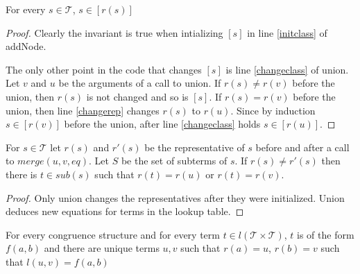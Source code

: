 











\begin{invariant}

For every $s \in \mathcal{T}$, $s \in [r(s)]$
\label{invar:class}
\end{invariant}

\begin{proof}

Clearly the invariant is true when intializing $[s]$ in line \ref{initclass} of addNode.

The only other point in the code that changes $[s]$ is line \ref{changeclass} of union.
Let $v$ and $u$ be the arguments of a call to union.
If $r(s) \neq r(v)$ before the union, then $r(s)$ is not changed and so is $[s]$.
If $r(s) = r(v)$ before the union, then line \ref{changerep} changes $r(s)$ to $r(u)$.
Since by induction $s \in [r(v)]$ before the union, after line \ref{changeclass} holds $s \in [r(u)]$.

\end{proof}

\begin{assertion}

For $s \in \mathcal{T}$ let $r(s)$ and $r'(s)$ be the representative of $s$ before and after a call to $merge(u,v,eq)$.
Let $S$ be the set of subterms of $s$.
If $r(s) \neq r'(s)$ then there is $t \in sub(s)$ such that $r(t) = r(u)$ or $r(t) = r(v)$.

\end{assertion}

\begin{proof}

Only union changes the representatives after they were initialized.
Union deduces new equations for terms in the lookup table.

\end{proof}

\begin{invariant}[Lookup]

For every congruence structure and for every term $t \in l(\mathcal{T}\times \mathcal{T})$, $t$ is of the form $f(a,b)$ and there are unique terms $u,v$ such that $r(a) = u$, $r(b) = v$ such that $l(u,v) = f(a,b)$

\end{invariant}

